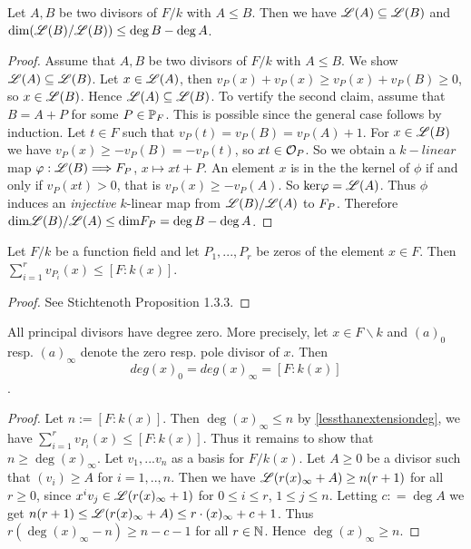 \begin{proposition} \label{Dimofthequotient}
	Let $A,B$ be two divisors of $F/k$ with $A \leq B$. 
	Then we have $\mathscr{L}(A) \subseteq \mathscr{L}(B)$ and $\text{dim}(\mathscr{L}(B)/\mathscr{L}(B)) \leq \deg B - \deg A$. 
\end{proposition}

\begin{proof}
	Assume that $A,B$ be two divisors of $F/k$ with $A \leq B$.  
	We show $\mathscr{L}(A) \subseteq \mathscr{L}(B)$. Let $x \in \mathscr{L}(A)$, then 
	$v_P(x) + v_P(x) \geq v_P(x) + v_P(B) \geq 0 $, so $x \in \mathscr{L}(B)$.
	Hence $\mathscr{L}(A) \subseteq \mathscr{L}(B)$. 
	To vertify the second claim, assume that 
	$B = A + P $ for some $P\in \mathbb{P}_F$. This is possible since 
	the general case follows by induction. Let $t \in F $ such that 
	$v_P(t) = v_P(B) = v_P(A) + 1$. For $x \in \mathscr{L} (B)$ we have 
	$v_P(x ) \geq - v_P(B) = - v_P(t)$, so $xt\in \mathcal{O}_P$. So we obtain
	a $k-linear$ map $ \varphi : \mathscr{L}(B) \Longrightarrow F_P$, $x \mapsto xt + P$. 
	An element $x$ is in the the kernel of $\phi $ if and only if 
	$v_P(xt) > 0$, that is $v_P(x) \geq - v_P(A)$. So $\text{ker} \varphi = \mathscr{L}(A)$.
	Thus $\phi $ induces an \textit{injective} $k$-linear map from $\mathscr{L}(B)/ \mathscr{L}(A)$ to $F_P$. 
	Therefore $\text{dim} \mathscr{L}(B)/ \mathscr{L}(A) \leq \text{dim} F_P = \deg B - \deg A$.
\end{proof}

\begin{lemma} \label{lessthanextensiondeg}
	Let $F/k$ be a function field and let $P_1,...,P_r$ be 
	zeros of the element $x \in F$. Then $ \sum^r_{i=1} v_{P_i}(x) \leq [F:k(x)]$.
\end{lemma}

\begin{proof}
	See Stichtenoth Proposition 1.3.3.
\end{proof}

\begin{theorem} \label{Princ0}
	All principal divisors have degree zero. More precisely, 
	let $x \in F \backslash k$ and $(a)_0$ resp. $(a)_{\infty}$ 
	denote the zero resp. pole divisor of $x$. 
	Then $$deg(x)_0=deg(x)_{\infty}=[F:k(x)]$$. 
\end{theorem}


\begin{proof}
	Let $n := [F:k(x)]$. Then $\deg (x)_\infty  \leq n$ by 
	\ref{lessthanextensiondeg}, we have 
	$\sum^r_{i=1 }v_{P_i}(x) \leq [F:k(x)]$.
	Thus it remains to show that $n \geq \deg (x)_\infty $. 
	Let $v_1,...v_n$ as a basis for $F/k(x)$. Let $A \geq 0$ 
	be a divisor such that $(v_i) \geq A$ for $i = 1,..,n$.
	Then we have $\mathscr{L}(r(x)_\infty + A ) \geq n(r +1 )$ for 
	all $r \geq 0$, since $x^iv_j \in \mathscr{L} (r (x)_\infty + 1)$ 
	for $0 \leq i \leq r$, $1 \leq j \leq n$. Letting $c: = \deg A$
	we get $n(r + 1 ) \leq \mathscr{L} (r(x)_\infty +A) \leq r \cdot (x)_\infty + c + 1 $. 
	Thus $r(\deg (x)_\infty - n )  \geq n - c - 1 $ 
	for all $r \in \mathbb{N}$. Hence $\deg (x)_\infty \geq n$.
\end{proof}

